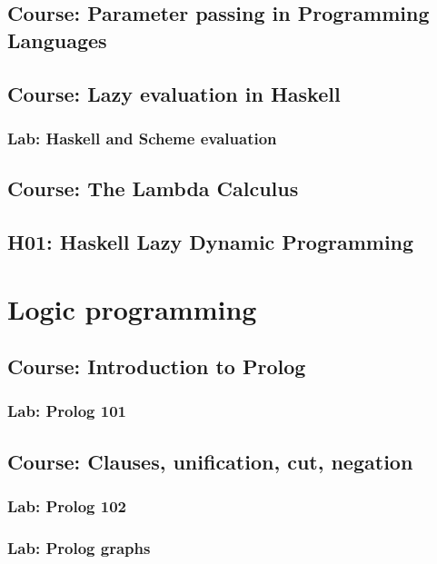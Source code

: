 \documentclass[a4paper, 12pt]{report}
\begin{document}
\section{ Course: Parameter passing in Programming Languages}

\section{ Course: Lazy evaluation in Haskell}

\subsection{ Lab: Haskell and Scheme evaluation}

\section{ Course: The Lambda Calculus}

\section{ H01: Haskell Lazy Dynamic Programming}

\chapter{Logic programming}
\section{ Course: Introduction to Prolog}

\subsection{ Lab: Prolog 101}

\section{ Course: Clauses, unification, cut, negation}

\subsection{ Lab: Prolog 102}

\subsection{ Lab: Prolog graphs}

\newpage
\printnotes
\end{document}
